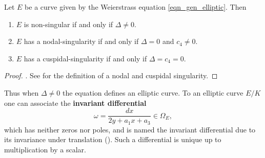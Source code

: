 
\begin{prop}\label{prop_nodecusp}
    Let $E$ be a curve given by the Weierstrass equation \eqref{eqn_gen_elliptic}. Then
    \begin{enumerate}
        \setlength\itemsep{0em}
        \item $E$ is non-singular if and only if $\Delta\neq0$.
        \item $E$ has a nodal-singularity if and only if $\Delta=0$ and $c_4 \neq 0$.
        \item $E$ has a cuspidal-singularity if and only if $\Delta= c_4 = 0$. 
    \end{enumerate}
\end{prop}
\begin{proof}
    \cite[\S {} Proposition 1.4]{S1}. See \cite[\S {}.1]{S1} for the definition of a nodal and cuspidal singularity.
\end{proof}
Thus when $\Delta\neq0$ the equation defines an elliptic curve. %
To an elliptic curve $E / K$ one can associate the \textbf{invariant differential} 
$$ \omega = \frac{dx}{2y + a_1 x + a_3} \in \Omega_E,$$
which has neither zeros nor poles, and is named the invariant differential due to its invariance under translation (\cite[\S{}.5, Proposition 5.1]{S1}). Such a differential is unique up to multiplication by a scalar.

